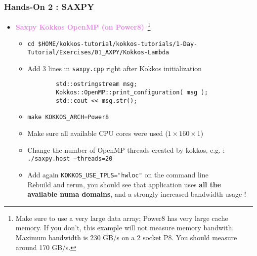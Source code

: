 \begin{frame}[fragile=singleslide]
  \frametitle{Hands-On 2 : SAXPY}

  \begin{itemize}
  \item \textcolor{violet}{\textbf{Saxpy Kokkos OpenMP (on Power8)}}~\footnote{Make sure to use a very large data array; Power8 has very large cache memory. If you don't, this example will not measure memory bandwith. Maximum bandwidth is 230 GB/s on a 2 socket P8. You should measure around 170 GB/s.}
    \begin{itemize}
    \item \texttt{cd \$HOME/kokkos-tutorial/kokkos-tutorials/1-Day-Tutorial/Exercises/01\_AXPY/Kokkos-Lambda}
    \item Add 3 lines in \texttt{saxpy.cpp} right after Kokkos initialization
      \begin{verbatim}
        std::ostringstream msg;
        Kokkos::OpenMP::print_configuration( msg );
        std::cout << msg.str();
      \end{verbatim}
    \item \texttt{make KOKKOS\_ARCH=Power8}
    \item Make sure all available CPU cores were used ($1\times 160 \times 1$)
    \item Change the number of OpenMP threads created by kokkos, e.g. :\\
      \texttt{./saxpy.host  --threads=20}
    \item Add again \texttt{KOKKOS\_USE\_TPLS="hwloc"} on the command line\\
      Rebuild and rerun, you should see that application uses \textbf{all the available numa domains}, and a strongly increased bandwidth usage !
    \end{itemize}
  \end{itemize}

\end{frame}

